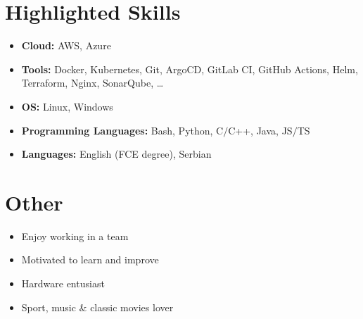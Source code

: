 \documentclass[a4paper]{moderncv}
\begin{document}

\section{Highlighted Skills}

	\begin{itemize}
		
		\item \textbf{Cloud: } AWS, Azure
		\item \textbf{Tools: } Docker, Kubernetes, Git, ArgoCD, GitLab CI, GitHub Actions, Helm, Terraform, Nginx, SonarQube, \dots
		\item \textbf{OS: } Linux, Windows
		\item \textbf{Programming Languages: } Bash, Python, C$\slash$C++, Java, JS$\slash$TS
		\item \textbf{Languages: } English (FCE degree), Serbian
		
	\end{itemize}
%
%
\section{Other}
	\vspace{-1em}
	\begin{multicols*}{2}
		\begin{itemize}
			\setlength\itemsep{-1.2pt}
			\item Enjoy working in a team
			\item Motivated to learn and improve
			\item Hardware entusiast			
			\item Sport, music \& classic movies lover
		\end{itemize}		
	\end{multicols*}

\end{document}
